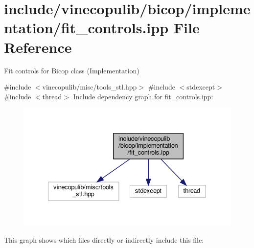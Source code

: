 \hypertarget{bicop_2implementation_2fit__controls_8ipp}{}\section{include/vinecopulib/bicop/implementation/fit\+\_\+controls.ipp File Reference}
\label{bicop_2implementation_2fit__controls_8ipp}


Fit controls for Bicop class (Implementation)  


{\ttfamily \#include $<$vinecopulib/misc/tools\+\_\+stl.\+hpp$>$}\newline
{\ttfamily \#include $<$stdexcept$>$}\newline
{\ttfamily \#include $<$thread$>$}\newline
Include dependency graph for fit\+\_\+controls.\+ipp\+:\nopagebreak
\begin{figure}[H]
\begin{center}
\leavevmode
\includegraphics[width=333pt]{bicop_2implementation_2fit__controls_8ipp__incl}
\end{center}
\end{figure}
This graph shows which files directly or indirectly include this file\+:\nopagebreak
